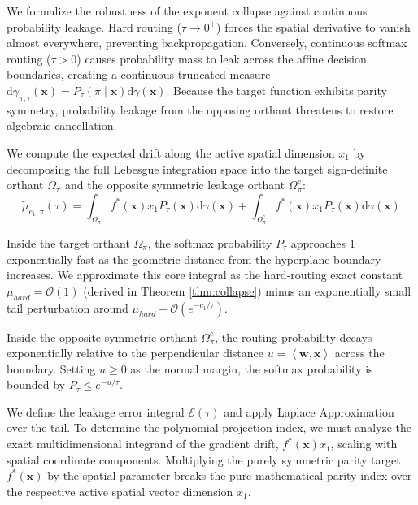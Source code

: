\documentclass{article}
\newcommand{\1}{\mathbb{I}}
\newcommand{\diff}{\mathrm{d}}
\newcommand{\inner}[2]{\left\langle#1, #2\right\rangle}
\newcommand{\calO}{\mathcal{O}}
\newcommand{\bx}{\mathbf{x}}
\newcommand{\bw}{\mathbf{w}}
\begin{document}
We formalize the robustness of the exponent collapse against continuous probability leakage. Hard routing ($\tau \to 0^+$) forces the spatial derivative to vanish almost everywhere, preventing backpropagation. Conversely, continuous softmax routing ($\tau > 0$) causes probability mass to leak across the affine decision boundaries, creating a continuous truncated measure $\diff\gamma_{\pi, \tau}(\bx) = P_\tau(\pi \mid \bx) \diff\gamma(\bx)$. Because the target function exhibits parity symmetry, probability leakage from the opposing orthant threatens to restore algebraic cancellation.

We compute the expected drift along the active spatial dimension $x_1$ by decomposing the full Lebesgue integration space into the target sign-definite orthant $\Omega_\pi$ and the opposite symmetric leakage orthant $\Omega_\pi^c$:
\begin{equation}
    \tilde{\mu}_{e_1, \pi}(\tau) = \int_{\Omega_\pi} f^*(\bx) x_1 P_\tau(\bx) \diff\gamma(\bx) + \int_{\Omega_\pi^c} f^*(\bx) x_1 P_\tau(\bx) \diff\gamma(\bx)
\end{equation}

Inside the target orthant $\Omega_\pi$, the softmax probability $P_\tau$ approaches $1$ exponentially fast as the geometric distance from the hyperplane boundary increases. We approximate this core integral as the hard-routing exact constant $\mu_{hard} = \calO(1)$ (derived in Theorem \ref{thm:collapse}) minus an exponentially small tail perturbation around $\mu_{hard} - \calO(e^{-c_1/\tau})$.

Inside the opposite symmetric orthant $\Omega_\pi^c$, the routing probability decays exponentially relative to the perpendicular distance $u = \inner{\bw}{\bx}$ across the boundary. Setting $u \ge 0$ as the normal margin, the softmax probability is bounded by $P_\tau \le e^{-u/\tau}$. 

We define the leakage error integral $\mathcal{E}(\tau)$ and apply Laplace Approximation over the tail. To determine the polynomial projection index, we must analyze the exact multidimensional integrand of the gradient drift, $f^*(\bx)x_1$, scaling with spatial coordinate components. Multiplying the purely symmetric parity target $f^*(\bx)$ by the spatial parameter breaks the pure mathematical parity index over the respective active spatial vector dimension $x_1$. 
\end{document}
